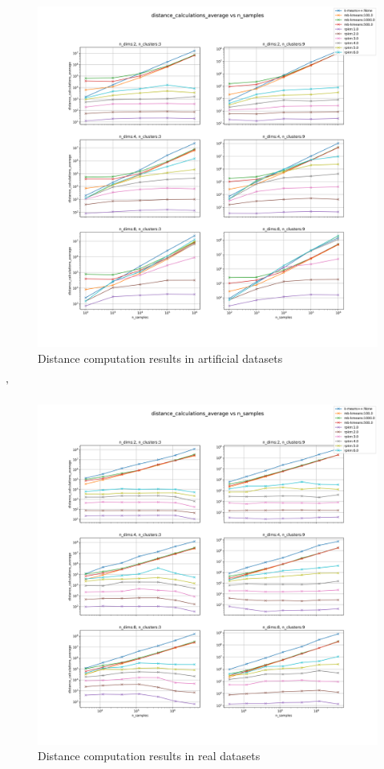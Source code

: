 \begin{figure}[!ht]
    \includegraphics[width=\linewidth]{images/experiments/distances_artificial.png}
    \caption{Distance computation results in artificial datasets}
    \label{fig:distance_art}
\end{figure}
'
\begin{figure}[!ht]
    \includegraphics[width=\linewidth]{images/experiments/distances_real.png}
    \caption{Distance computation results in real datasets}
    \label{fig:distance_real}
\end{figure}

